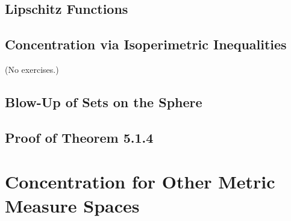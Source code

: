 \documentclass{report}
\theoremstyle{definition}
\newenvironment{exercise}[1]{
  \renewcommand\theexerciseimpl{#1}
  \exerciseimpl
}{\endexerciseimpl}
\begin{document}
\subsection{Lipschitz Functions}

\begin{exercise}{5.1.2}
\end{exercise}

\begin{exercise}{5.1.3}
\end{exercise}

\subsection{Concentration via Isoperimetric Inequalities}

(No exercises.)

\subsection{Blow-Up of Sets on the Sphere}

\begin{exercise}{5.1.8}
\end{exercise}

\begin{exercise}{5.1.9}
\end{exercise}

\subsection{Proof of Theorem 5.1.4}

\begin{exercise}{5.1.11}
\end{exercise}

\begin{exercise}{5.1.12}
\end{exercise}

\begin{exercise}{5.1.13}
\end{exercise}

\begin{exercise}{5.1.14}
\end{exercise}

\begin{exercise}{5.1.15}
\end{exercise}

\section{Concentration for Other Metric Measure Spaces}
\end{document}
